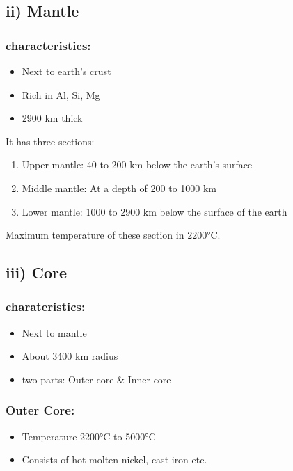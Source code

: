 \documentclass{article}
\begin{document}
\begin{multicols*}{2}
  \subsection*{ii) Mantle}
  \subsubsection*{characteristics:}
  \begin{itemize}
    \item Next to earth's crust 
    \item Rich in Al, Si, Mg 
    \item 2900 km thick 
  \end{itemize}

  It has three sections:
  \begin{enumerate}
    \item Upper mantle: 40 to 200 km below the earth's surface 
    \item Middle mantle: At a depth of 200 to 1000 km 
    \item Lower mantle: 1000 to 2900 km below the surface of the earth 
  \end{enumerate}
  Maximum temperature of these section in 2200°C. 

  \subsection*{iii) Core}
  \subsubsection*{charateristics:}
  \begin{itemize}
    \item Next to mantle 
    \item About 3400 km radius 
    \item two parts: Outer core \& Inner core 
  \end{itemize}

  \subsubsection*{Outer Core:}
  \begin{itemize}
    \item Temperature 2200°C to 5000°C 
    \item Consists of hot molten nickel, cast iron etc. 
  \end{itemize}


\end{multicols*}
\end{document}
